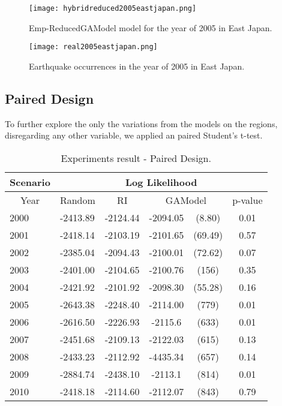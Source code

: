 \begin{figure}[H]
	\begin{minipage}{0.45\textwidth}
		\centering
			\texttt{[image: hybridreduced2005eastjapan.png]}
			\caption{Emp-ReducedGAModel model for the year of 2005 in East Japan.}
			\label{hybridreduced2005eastjapan}
	\end{minipage}
	\begin{minipage}{0.45\textwidth}
		\centering
		\texttt{[image: real2005eastjapan.png]}
		\caption{Earthquake occurrences in the year of 2005 in East Japan.}
		\label{real2005eastjapan}
	\end{minipage}
\end{figure}


\subsection{Paired Design}

To further explore the only the variations from the models on the regions, disregarding any other variable, we applied an paired Student’s t-test. 
\begin{table*}[!ht]
	\begin{center}
		\begin{tabular}{|l|l|c|cc|c|}
			\hline
			\multicolumn{1}{|c|}{Scenario} & \multicolumn{5}{|c|}{Log Likelihood} \\
			\hline
			\multicolumn{1}{|c|}{Year} & \multicolumn{1}{|c|}{Random} & \multicolumn{1}{|c|}{RI} & \multicolumn{2}{c}{GAModel} & \multicolumn{1}{|c|}{p-value} \\    
			\hline
			2000 &-2413.89 &-2124.44 &\raggedright  -2094.05 &\raggedleft (8.80) & 0.01\\%
			2001 &-2418.14 &-2103.19 &\raggedright  -2101.65 &\raggedleft  (69.49) & 0.57\\%
			2002 &-2385.04 &-2094.43 &\raggedright  -2100.01 &\raggedleft (72.62) & 0.07\\%
			2003 &-2401.00 &-2104.65 &\raggedright  -2100.76 &\raggedleft (156) & 0.35\\%
			2004 &-2421.92 &-2101.92 &\raggedright  -2098.30 &\raggedleft (55.28) & 0.16\\%
			2005 &-2643.38 &-2248.40 &\raggedright  -2114.00 &\raggedleft (779) & 0.01\\%
			2006 &-2616.50 &-2226.93 &\raggedright  -2115.6 &\raggedleft (633) & 0.01\\%
			2007 &-2451.68 &-2109.13 &\raggedright  -2122.03 &\raggedleft (615) &  0.13\\%
			2008 &-2433.23 &-2112.92 &\raggedright  -4435.34 &\raggedleft (657) & 0.14\\%
			2009 &-2884.74 &-2438.10 &\raggedright  -2113.1 &\raggedleft (814) & 0.01\\%
			2010 &-2418.18 &-2114.60 &\raggedright -2112.07 &\raggedleft (843) & 0.79\\%
			\hline
		\end{tabular}
	\end{center}
	\caption{Experiments result - Paired Design.}
	\label{gaxriTable??}
\end{table*}